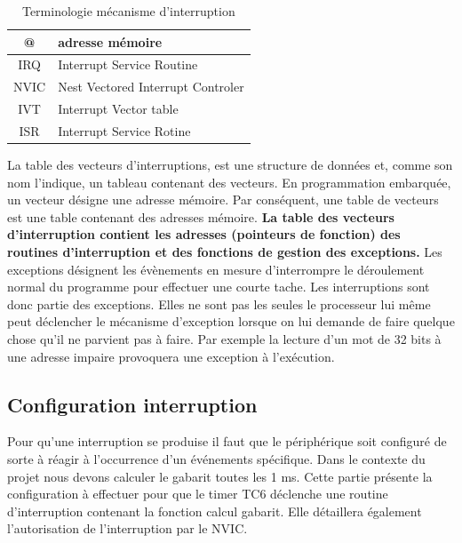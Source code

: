 \documentclass[a4paper]{article}
\begin{document}
	\begin{table}[H]
		\centering
		\begin{tabular}{|c|l|}
			\hline
			@ & adresse mémoire \\
			\hline
			IRQ & Interrupt Service Routine \\
			\hline
			NVIC & Nest Vectored Interrupt Controler \\
			\hline
			IVT & Interrupt Vector table \\
			\hline
			ISR & Interrupt Service Rotine \\
			\hline
		\end{tabular}
	\caption{Terminologie mécanisme d'interruption}
	\end{table}
	La table des vecteurs d'interruptions, est une structure de données et, comme son nom l'indique, un tableau contenant des vecteurs. En programmation embarquée, un vecteur désigne une adresse mémoire. Par conséquent, une table de vecteurs est une table contenant des adresses mémoire. \textbf{La table des vecteurs d'interruption contient les adresses (pointeurs de fonction) des routines d'interruption et des fonctions de gestion des exceptions.} Les exceptions désignent les évènements en mesure d'interrompre le déroulement normal du programme pour effectuer une courte tache. Les interruptions sont donc partie des exceptions. Elles ne sont pas les seules le processeur lui même peut déclencher le mécanisme d'exception lorsque on lui demande de faire quelque chose qu’il ne parvient pas à faire. Par exemple la lecture d'un mot de 32 bits à une adresse impaire provoquera une exception à l'exécution.
	
	\subsection{Configuration interruption}
	Pour qu'une interruption se produise il faut que le périphérique soit configuré de sorte à réagir à l'occurrence d'un événements spécifique. Dans le contexte du projet nous devons calculer le gabarit toutes les 1 ms. Cette partie présente la configuration à effectuer pour que le timer TC6 déclenche une routine d'interruption contenant la fonction calcul gabarit. Elle détaillera également l'autorisation de l'interruption par le NVIC.
\end{document}
